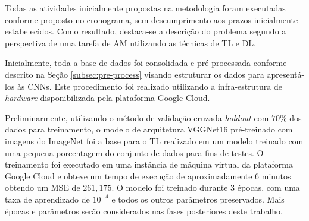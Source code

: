 Todas as atividades inicialmente propostas na metodologia foram executadas conforme proposto no cronograma, sem descumprimento aos prazos inicialmente estabelecidos. Como resultado, destaca-se a descrição do problema segundo a perspectiva de uma tarefa de AM utilizando as técnicas de TL e DL.

Inicialmente, toda a base de dados foi consolidada e pré-processada conforme descrito na Seção \ref{subsec:pre-process} visando estruturar os dados para apresentá-los às CNNs. Este procedimento foi realizado utilizando a infra-estrutura de \emph{hardware} disponibilizada pela plataforma Google Cloud.

Preliminarmente, utilizando o método de validação cruzada \emph{holdout} com $70\%$ dos dados para treinamento, o modelo de arquitetura VGGNet16 pré-treinado com imagens do ImageNet foi a base para o TL realizado em um modelo treinado com uma pequena porcentagem do conjunto de dados para fins de testes. O treinamento foi executado em uma instância de máquina virtual da plataforma Google Cloud e obteve um tempo de execução de aproximadamente 6 minutos obtendo um MSE de $261,175$. O modelo foi treinado durante $3$ épocas, com uma taxa de aprendizado de $10^{-4}$ e todos os outros parâmetros preservados. Mais épocas e parâmetros serão considerados nas fases posteriores deste trabalho.
